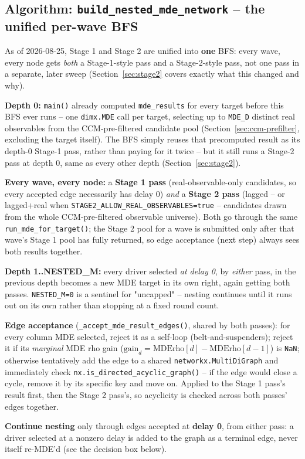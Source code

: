 \documentclass[11pt]{article}
\begin{document}
\subsection{Algorithm: \texttt{build\_nested\_mde\_network} -- the unified per-wave BFS}
As of 2026-08-25, Stage 1 and Stage 2 are unified into \textbf{one} BFS: every wave, every node gets \emph{both} a Stage-1-style pass and a Stage-2-style pass, not one pass in a separate, later sweep (Section~\ref{sec:stage2} covers exactly what this changed and why).
\begin{steps}
\item \textbf{Depth 0:} \texttt{main()} already computed \texttt{mde\_results} for every target before this BFS ever runs -- one \texttt{dimx.MDE} call per target, selecting up to \texttt{MDE\_D} distinct real observables from the CCM-pre-filtered candidate pool (Section~\ref{sec:ccm-prefilter}, excluding the target itself). The BFS simply reuses that precomputed result as its depth-0 Stage-1 pass, rather than paying for it twice -- but it still runs a Stage-2 pass at depth 0, same as every other depth (Section~\ref{sec:stage2}).
\item \textbf{Every wave, every node:} a \textbf{Stage 1 pass} (real-observable-only candidates, so every accepted edge necessarily has delay 0) \emph{and} a \textbf{Stage 2 pass} (lagged -- or lagged+real when \texttt{STAGE2\_ALLOW\_REAL\_OBSERVABLES=true} -- candidates drawn from the whole CCM-pre-filtered observable universe). Both go through the same \texttt{run\_mde\_for\_target()}; the Stage 2 pool for a wave is submitted only after that wave's Stage 1 pool has fully returned, so edge acceptance (next step) always sees both results together.
\item \textbf{Depth 1..NESTED\_M:} every driver selected \emph{at delay 0}, by \emph{either} pass, in the previous depth becomes a new MDE target in its own right, again getting both passes. \texttt{NESTED\_M=0} is a sentinel for "uncapped" -- nesting continues until it runs out on its own rather than stopping at a fixed round count.
\item \textbf{Edge acceptance} (\texttt{\_accept\_mde\_result\_edges()}, shared by both passes): for every column MDE selected, reject it as a self-loop (belt-and-suspenders); reject it if its \emph{marginal} MDE rho gain ($\mathrm{gain}_d = \mathrm{MDErho}[d]-\mathrm{MDErho}[d{-}1]$) is \texttt{NaN}; otherwise tentatively add the edge to a shared \texttt{networkx.MultiDiGraph} and immediately check \texttt{nx.is\_directed\_acyclic\_graph()} -- if the edge would close a cycle, remove it by its specific key and move on. Applied to the Stage 1 pass's result first, then the Stage 2 pass's, so acyclicity is checked across both passes' edges together.
\item \textbf{Continue nesting} only through edges accepted at \textbf{delay 0}, from either pass: a driver selected at a nonzero delay is added to the graph as a terminal edge, never itself re-MDE'd (see the decision box below).
\end{steps}
\end{document}
